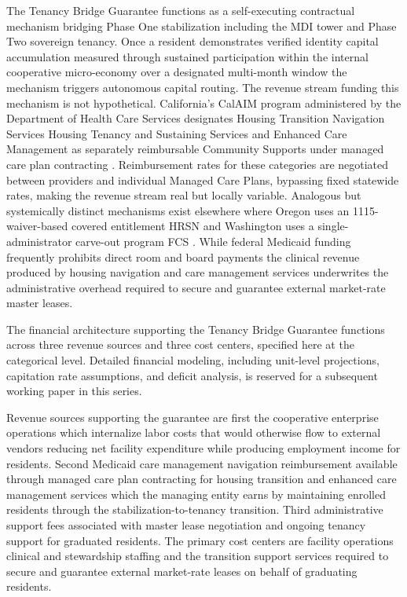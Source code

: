 \documentclass[12pt, letterpaper]{article}
\begin{document}
The Tenancy Bridge Guarantee functions as a self-executing contractual mechanism bridging Phase One stabilization including the MDI tower and Phase Two sovereign tenancy. Once a resident demonstrates verified identity capital accumulation measured through sustained participation within the internal cooperative micro-economy over a designated multi-month window the mechanism triggers autonomous capital routing. The revenue stream funding this mechanism is not hypothetical. California's CalAIM program administered by the Department of Health Care Services designates Housing Transition Navigation Services Housing Tenancy and Sustaining Services and Enhanced Care Management as separately reimbursable Community Supports under managed care plan contracting \citep{dhcs2025community, chcf2021pricing}. Reimbursement rates for these categories are negotiated between providers and individual Managed Care Plans, bypassing fixed statewide rates, making the revenue stream real but locally variable. Analogous but systemically distinct mechanisms exist elsewhere where Oregon uses an 1115-waiver-based covered entitlement HRSN \citep{oha2024hrsn} and Washington uses a single-administrator carve-out program FCS \citep{nashp2024managedcare}. While federal Medicaid funding frequently prohibits direct room and board payments the clinical revenue produced by housing navigation and care management services underwrites the administrative overhead required to secure and guarantee external market-rate master leases.

The financial architecture supporting the Tenancy Bridge Guarantee functions across three revenue sources and three cost centers, specified here at the categorical level. Detailed financial modeling, including unit-level projections, capitation rate assumptions, and deficit analysis, is reserved for a subsequent working paper in this series.

Revenue sources supporting the guarantee are first the cooperative enterprise operations which internalize labor costs that would otherwise flow to external vendors reducing net facility expenditure while producing employment income for residents. Second Medicaid care management navigation reimbursement available through managed care plan contracting for housing transition and enhanced care management services which the managing entity earns by maintaining enrolled residents through the stabilization-to-tenancy transition. Third administrative support fees associated with master lease negotiation and ongoing tenancy support for graduated residents. The primary cost centers are facility operations clinical and stewardship staffing and the transition support services required to secure and guarantee external market-rate leases on behalf of graduating residents.
\end{document}
